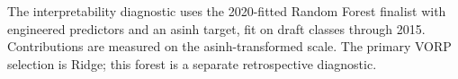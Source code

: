 The interpretability diagnostic uses the 2020-fitted Random Forest finalist with engineered predictors and an asinh target, fit on draft classes through 2015. Contributions are measured on the asinh-transformed scale. The primary VORP selection is Ridge; this forest is a separate retrospective diagnostic.